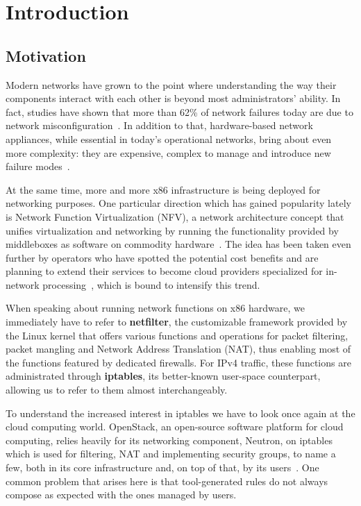 \chapter{Introduction}


\section{Motivation}

Modern networks have grown to the point where understanding the way their
components interact with each other is beyond most administrators' ability. In
fact, studies have shown that more than 62\% of network failures today are due
to network misconfiguration~\cite{alimi2008shadow}.  In addition to that,
hardware-based network appliances, while essential in today's operational
networks, bring about even more complexity: they are expensive, complex to
manage and introduce new failure modes~\cite{sherry2012making}.

At the same time, more and more x86 infrastructure is being deployed for
networking purposes. One particular direction which has gained popularity lately
is Network Function Virtualization (NFV), a network architecture concept that unifies virtualization and
networking by running the functionality provided by middleboxes as software on
commodity hardware~\cite{martins2014clickos, stoenescu2015net}. The idea has
been taken even further by operators who have spotted the potential cost
benefits and are planning to extend their services to become cloud providers
specialized for in-network processing~\cite{stoenescu2015net}, which is bound
to intensify this trend.

When speaking about running network functions on x86 hardware, we immediately
have to refer to \textbf{netfilter}, the customizable framework provided by the
Linux kernel that offers various functions and operations for packet filtering,
packet mangling and Network Address Translation (NAT), thus enabling most of the functions featured by dedicated
firewalls. For IPv4 traffic, these functions are administrated through
\textbf{iptables}, its better-known user-space counterpart, allowing us to
refer to them almost interchangeably.

To understand the increased interest in iptables we have to look once again at
the cloud computing world.  OpenStack, an open-source software platform for
cloud computing, relies heavily for its networking component, Neutron, on
iptables which is used for filtering, NAT and implementing security groups, to
name a few, both in its core infrastructure and, on top of that, by its
users~\cite{denton2014learning}.  One common problem that arises here is that
tool-generated rules do not always compose as expected with the ones managed by
users.

